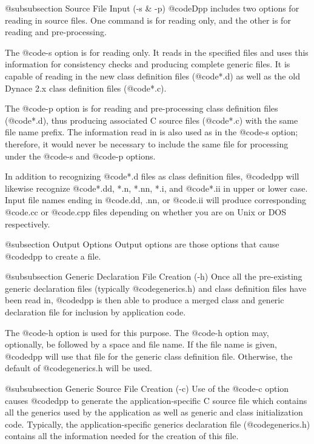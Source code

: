 @subsubsection Source File Input (-s & -p)
@code{Dpp} includes two options for reading in source files.  One
command is for reading only, and the other is for reading and
pre-processing.

The @code{-s} option is for reading only.  It reads in the specified
files and uses this information for consistency checks and producing
complete generic files.  It is capable of reading in the new
class definition files (@code{*.d}) as well as the old Dynace 2.x
class definition files (@code{*.c}).

The @code{-p} option is for reading and pre-processing class
definition files (@code{*.d}), thus producing associated
C source files (@code{*.c}) with the same file name prefix.
The information read in is also used as in the @code{-s} option;
therefore, it would never be necessary to include the same
file for processing under the @code{-s} and @code{-p} options.

In addition to recognizing @code{*.d} files as class definition files,
@code{dpp} will likewise recognize @code{*.dd, *.n, *.nn, *.i}, and
@code{*.ii} in upper or lower case.  Input file names ending in
@code{.dd, .nn}, or @code{.ii} will produce corresponding @code{.cc} or
@code{.cpp} files depending on whether you are on Unix or DOS
respectively.

@subsection Output Options
Output options are those options that cause @code{dpp} to create
a file.

@subsubsection Generic Declaration File Creation (-h)
Once all the pre-existing generic declaration files (typically
@code{generics.h}) and class definition files have been read in,
@code{dpp} is then able to produce a merged class and generic
declaration file for inclusion by application code.

The @code{-h} option is used for this purpose.  The @code{-h} option
may, optionally, be followed by a space and file name.  If the file name
is given, @code{dpp} will use that file for the generic class definition
file.  Otherwise, the default of @code{generics.h} will be used.

@subsubsection Generic Source File Creation (-c)
Use of the @code{-c} option causes @code{dpp} to generate the
application-specific C source file which contains all the
generics used by the application as well as generic and class
initialization code.  Typically, the application-specific
generics declaration file (@code{generics.h}) contains
all the information needed for the creation of this file.


